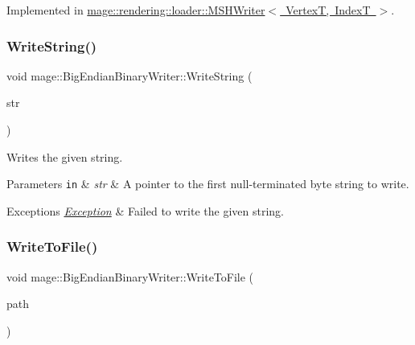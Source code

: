 Implemented in \mbox{\hyperlink{classmage_1_1rendering_1_1loader_1_1_m_s_h_writer_ad61ee7097e1bfb52ca9a0697d2cd6a7e}{mage\+::rendering\+::loader\+::\+M\+S\+H\+Writer$<$ Vertex\+T, Index\+T $>$}}.

\mbox{\label{classmage_1_1_big_endian_binary_writer_acf065a2e7462c9e6cf46849bd2c9d2e7}} 
\subsubsection{\texorpdfstring{Write\+String()}{WriteString()}}
{\footnotesize\ttfamily void mage\+::\+Big\+Endian\+Binary\+Writer\+::\+Write\+String (\begin{DoxyParamCaption}\item[{\mbox{\hyperlink{namespacemage_a8769f9d670d6b585ea306cb1062af94b}{Not\+Null}}$<$ \mbox{\hyperlink{namespacemage_abfd9206dc607ceb5d13ec68bf075a5c0}{const\+\_\+zstring}} $>$}]{str }\end{DoxyParamCaption})\hspace{0.3cm}{\ttfamily [protected]}}

Writes the given string.


\begin{DoxyParams}[1]{Parameters}
\mbox{\tt in}  & {\em str} & A pointer to the first null-\/terminated byte string to write. \\
\hline
\end{DoxyParams}

\begin{DoxyExceptions}{Exceptions}
{\em \mbox{\hyperlink{classmage_1_1_exception}{Exception}}} & Failed to write the given string. \\
\hline
\end{DoxyExceptions}
\mbox{\label{classmage_1_1_big_endian_binary_writer_a6ce9780687a45a6c6f98e0843190b63b}} 
\subsubsection{\texorpdfstring{Write\+To\+File()}{WriteToFile()}}
{\footnotesize\ttfamily void mage\+::\+Big\+Endian\+Binary\+Writer\+::\+Write\+To\+File (\begin{DoxyParamCaption}\item[{std\+::filesystem\+::path}]{path }\end{DoxyParamCaption})}

